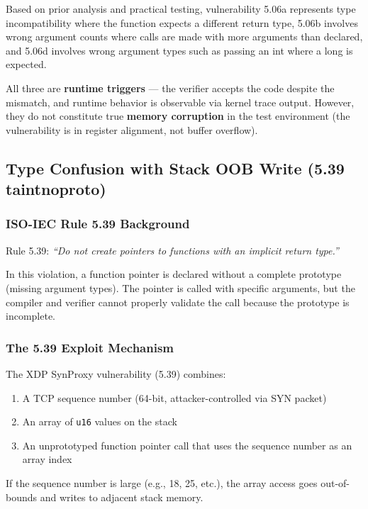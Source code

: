 Based on prior analysis and practical testing, vulnerability 5.06a represents type incompatibility where the function expects a different return type, 5.06b involves wrong argument counts where calls are made with more arguments than declared, and 5.06d involves wrong argument types such as passing an int where a long is expected.

All three are \textbf{runtime triggers} — the verifier accepts the code despite the mismatch, and runtime behavior is observable via kernel trace output. However, they do not constitute true \textbf{memory corruption} in the test environment (the vulnerability is in register alignment, not buffer overflow).

\subsection{Type Confusion with Stack OOB Write (5.39 taintnoproto)}

\subsubsection{ISO-IEC Rule 5.39 Background}

Rule 5.39: \textit{``Do not create pointers to functions with an implicit return type.''}

In this violation, a function pointer is declared without a complete prototype (missing argument types). The pointer is called with specific arguments, but the compiler and verifier cannot properly validate the call because the prototype is incomplete.

\subsubsection{The 5.39 Exploit Mechanism}

The XDP SynProxy vulnerability (5.39) combines:
\begin{enumerate}[label=\arabic*.]
  \item A TCP sequence number (64-bit, attacker-controlled via SYN packet)
  \item An array of \texttt{u16} values on the stack
  \item An unprototyped function pointer call that uses the sequence number as an array index
\end{enumerate}

If the sequence number is large (e.g., 18, 25, etc.), the array access goes out-of-bounds and writes to adjacent stack memory.

